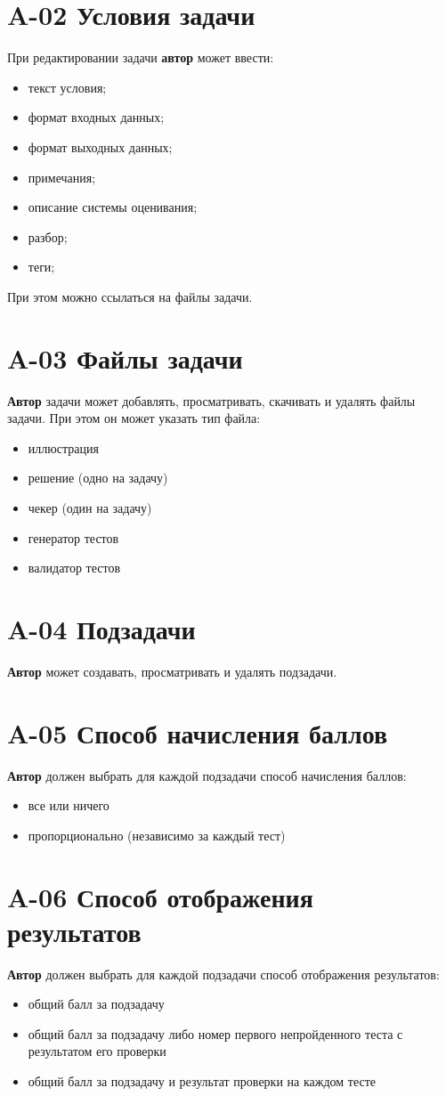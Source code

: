 \documentclass{book}
\newcommand{\newcard}[1]{\newpage \section*{#1}}
\begin{document}
\newcard{A-02 Условия задачи}
При редактировании задачи \textbf{автор} может ввести:
\begin{itemize}\setlength\itemsep{0pt}
	\item текст условия;
	\item формат входных данных;
	\item формат выходных данных;
	\item примечания;
	\item описание системы оценивания;
	\item разбор;
	\item теги;
\end{itemize}

При этом можно ссылаться на файлы задачи.

\newcard{A-03 Файлы задачи}
\textbf{Автор} задачи может добавлять, просматривать, скачивать и удалять файлы задачи.
При этом он может указать тип файла:
\begin{itemize}\setlength{\itemsep}{0pt}
	\item иллюстрация
	\item решение (одно на задачу)
	\item чекер (один на задачу)
	\item генератор тестов
	\item валидатор тестов
\end{itemize}

\newcard{A-04 Подзадачи}
\textbf{Автор} может создавать, просматривать и удалять подзадачи. 

\newcard{A-05 Способ начисления баллов}
\textbf{Автор} должен выбрать для каждой подзадачи способ начисления баллов:
\begin{itemize}\setlength{\itemsep}{0pt}
	\item все или ничего
	\item пропорционально (независимо за каждый тест)
\end{itemize}

\newcard{A-06 Способ отображения результатов}
\textbf{Автор} должен выбрать для каждой подзадачи способ отображения результатов:
\begin{itemize}\setlength{\itemsep}{0pt}
	\item общий балл за подзадачу
	\item общий балл за подзадачу либо номер первого непройденного теста с результатом его проверки
	\item общий балл за подзадачу и результат проверки на каждом тесте
\end{itemize}
\end{document}
